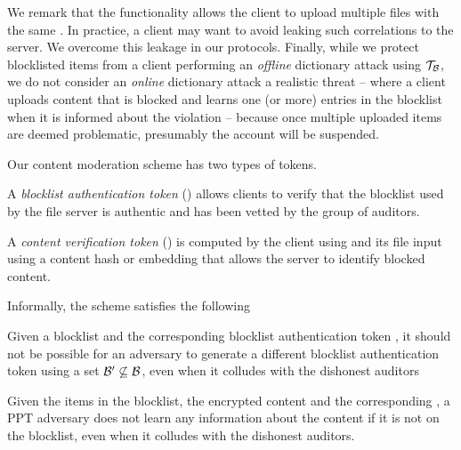 We remark that the functionality allows the client to upload multiple files with the same \contentToken{\clientData}. In practice, a client may want to avoid leaking such correlations to the server. We overcome this leakage in our protocols. Finally, while we protect blocklisted items from a client performing an \emph{offline} dictionary attack using $\blklistToken$,  we do not consider an \emph{online} dictionary attack a realistic threat -- where a client uploads content that is blocked and learns one (or more) entries in the blocklist when it is informed about the violation --  because once multiple uploaded items are deemed problematic, presumably the account will be suspended.






















\iffalse 
Our content moderation scheme has two types of tokens. 

\enumListStart
\item A \emph{blocklist authentication token} (\blklistToken{\blocklist}) allows clients to verify that the blocklist \blocklist used by the file server is authentic and has been vetted by the group of auditors. 
\item A \emph{content verification token} (\contentToken{\clientData}) is computed by the client using \blklistToken{\blocklist} and its file input \clientData using a content hash or embedding that allows the server to identify blocked content.
\enumListEnd



Informally, the scheme satisfies the following 

\enumListStart
	
	\item {} Given a blocklist \blocklist and the corresponding blocklist authentication token \blklistToken{\blocklist}, it should not be possible for an adversary to generate a different blocklist authentication token  using a set $\blocklist' \not \subseteq \blocklist$, even when it colludes with the dishonest auditors



	\item {}
	Given the items in the blocklist, the encrypted content and the corresponding \contentToken{\clientData}, a 
	PPT adversary does not learn any information about the content if it is not on the blocklist, even when it 
	colludes with the dishonest auditors. 
	

